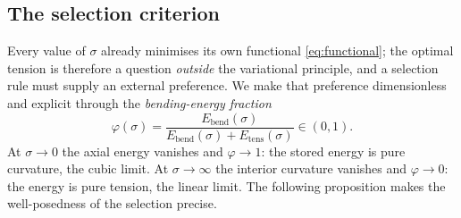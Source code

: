 \documentclass[]{interact}
\theoremstyle{plain}
\begin{document}
\subsection{The selection criterion}
Every value of $\sigma$ already minimises its own functional \eqref{eq:functional}; the optimal
tension is therefore a question \emph{outside} the variational principle, and a selection rule
must supply an external preference. We make that preference dimensionless and explicit through
the \emph{bending-energy fraction}
\begin{equation}
\varphi(\sigma)=\frac{E_{\mathrm{bend}}(\sigma)}{E_{\mathrm{bend}}(\sigma)+E_{\mathrm{tens}}(\sigma)}\in(0,1).
\label{eq:phi}
\end{equation}
At $\sigma\to0$ the axial energy vanishes and $\varphi\to1$: the stored energy is pure
curvature, the cubic limit. At $\sigma\to\infty$ the interior curvature vanishes and
$\varphi\to0$: the energy is pure tension, the linear limit. The following proposition makes
the well-posedness of the selection precise.
\end{document}
